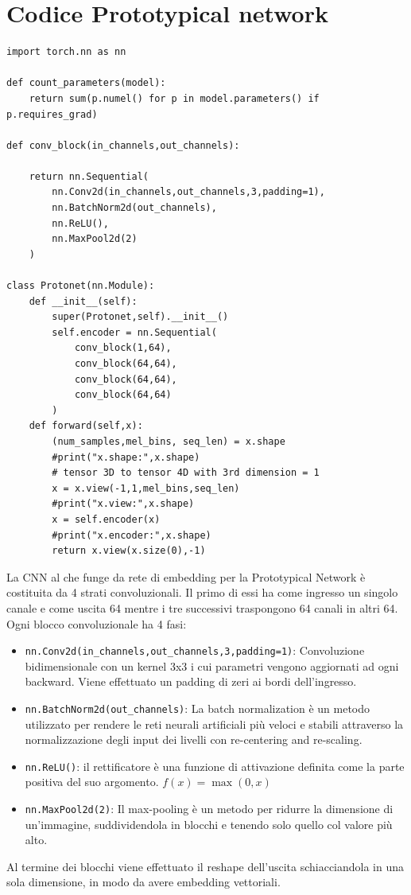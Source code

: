 \documentclass[12pt,a4paper,titlepage]{article}
\begin{document}
\section{Codice Prototypical network}
\begin{lstlisting}[language=iPython,firstnumber=1, caption=protonet.py, label= Protonet,captionpos=b]
import torch.nn as nn

def count_parameters(model):
    return sum(p.numel() for p in model.parameters() if p.requires_grad)

def conv_block(in_channels,out_channels):

    return nn.Sequential(
        nn.Conv2d(in_channels,out_channels,3,padding=1),
        nn.BatchNorm2d(out_channels),
        nn.ReLU(),
        nn.MaxPool2d(2)
    )

class Protonet(nn.Module):
    def __init__(self):
        super(Protonet,self).__init__()
        self.encoder = nn.Sequential(
            conv_block(1,64),
            conv_block(64,64),
            conv_block(64,64),
            conv_block(64,64)
        )
    def forward(self,x):
        (num_samples,mel_bins, seq_len) = x.shape
        #print("x.shape:",x.shape)
        # tensor 3D to tensor 4D with 3rd dimension = 1
        x = x.view(-1,1,mel_bins,seq_len) 
        #print("x.view:",x.shape)
        x = self.encoder(x)
        #print("x.encoder:",x.shape)
        return x.view(x.size(0),-1)
\end{lstlisting}
La CNN al che funge da rete di embedding per la Prototypical Network è costituita da 4 strati convoluzionali. Il primo di essi ha come ingresso un singolo canale e come uscita 64 mentre i tre successivi traspongono 64 canali in altri 64.
Ogni blocco convoluzionale ha 4 fasi:
\begin{itemize}
	\item \texttt{nn.Conv2d(in\_channels,out\_channels,3,padding=1)}: Convoluzione bidimensionale con un kernel 3x3 i cui parametri vengono aggiornati ad ogni backward. Viene effettuato un padding di zeri ai bordi dell'ingresso.
	\item \texttt{nn.BatchNorm2d(out\_channels)}: La batch normalization è un metodo utilizzato per rendere le reti neurali artificiali più veloci e stabili attraverso la normalizzazione degli input dei livelli con re-centering and re-scaling.
	\item \texttt{nn.ReLU()}: il rettificatore è una funzione di attivazione definita come la parte positiva del suo argomento. $f(x)=\max(0,x)$
	\item \texttt{nn.MaxPool2d(2)}: Il max-pooling è un metodo per ridurre la dimensione di un’immagine, suddividendola in blocchi e tenendo solo quello col valore più alto.
\end{itemize}
Al termine dei blocchi viene effettuato il reshape dell'uscita schiacciandola in una sola dimensione, in modo da avere embedding vettoriali.
\end{document}

